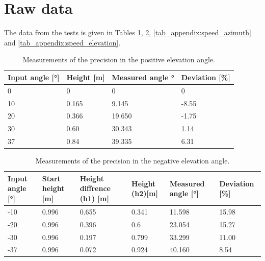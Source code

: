 \clearpage

\section*{Raw data}
The data from the tests is given in Tables \ref{tab_appendix:elevation_test_a}, \ref{tab_appendix:elevation_test_b}, \ref{tab_appendix:speed_azimuth} and \ref{tab_appendix:speed_elevation}.
\begin{table}[h!]
	\centering
	\caption{Measurements of the precision in the positive elevation angle.} \label{tab_appendix:elevation_test_a}
	\begin{tabularx}{\textwidth}{lXXX}
		Input angle [\si{\degree}]     & Height [\si{\meter}] &  Measured angle \si{\degree} & Deviation [\%]  \\ \toprule  \rowcolor{lightGrey} 
		0  &  0    & 0     & 0  \\
		10 & 0.165 & 9.145 & -8.55	\\\rowcolor{lightGrey}
		20 & 0.366 & 19.650 & -1.75 \\ 
		30 & 0.60 & 30.343 & 1.14\\ \rowcolor{lightGrey}
		37 & 0.84 & 39.335 & 6.31 \\ 
	\end{tabularx}
\end{table}

\begin{table}[h!]
	\centering
	\caption{Measurements of the precision in the negative elevation angle.} \label{tab_appendix:elevation_test_b}
	\begin{tabularx}{\textwidth}{lXXXXX}
		Input angle [\si{\degree}]    & Start height [\si{\meter}] &  Height diffrence (h1) [\si{\meter}] & Height (h2)[\si{\meter}] & Measured angle [\si{\degree}] & Deviation [\%] \\ \toprule  \rowcolor{lightGrey} 
		-10 & 0.996 & 0.655 & 0.341 & 11.598	& 15.98\\
		-20 & 0.996 & 0.396 & 0.6   & 23.054 & 15.27\\ \rowcolor{lightGrey}
		-30 & 0.996 & 0.197 & 0.799 & 33.299 & 11.00\\ 
		-37 & 0.996 & 0.072 & 0.924 & 40.160 & 8.54\\ 
	\end{tabularx}
\end{table}
 
